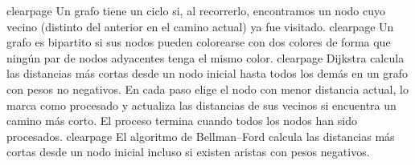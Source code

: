 {}\markdownRendererInterblockSeparator
{}\markdownRendererDollarSign{}\markdownRendererBackslash{}clearpage\markdownRendererDollarSign{}\markdownRendererInterblockSeparator
{}
\markdownRendererSectionEnd \markdownRendererSectionBegin
{}\markdownRendererInterblockSeparator
{}Un grafo tiene un ciclo si, al recorrerlo, encontramos un nodo cuyo vecino (distinto del anterior en el camino actual) ya fue visitado.\markdownRendererInterblockSeparator
{}\markdownRendererInterblockSeparator
{}\markdownRendererDollarSign{}\markdownRendererBackslash{}clearpage\markdownRendererDollarSign{}\markdownRendererInterblockSeparator
{}
\markdownRendererSectionEnd \markdownRendererSectionBegin
{}\markdownRendererInterblockSeparator
{}Un grafo es bipartito si sus nodos pueden colorearse con dos colores de forma que ningún par de nodos adyacentes tenga el mismo color.\markdownRendererInterblockSeparator
{}\markdownRendererInterblockSeparator
{}\markdownRendererDollarSign{}\markdownRendererBackslash{}clearpage\markdownRendererDollarSign{}\markdownRendererInterblockSeparator
{}
\markdownRendererSectionEnd 
\markdownRendererSectionEnd \markdownRendererSectionBegin
{}\markdownRendererParagraphSeparator
{}\markdownRendererSectionBegin
{}\markdownRendererInterblockSeparator
{}Dijkstra calcula las distancias más cortas desde un nodo inicial hasta todos los demás en un grafo con pesos no negativos.\markdownRendererParagraphSeparator
{}En cada paso elige el nodo con menor distancia actual, lo marca como procesado y actualiza las distancias de sus vecinos si encuentra un camino más corto. El proceso termina cuando todos los nodos han sido procesados.\markdownRendererParagraphSeparator
{}\markdownRendererParagraphSeparator
{}\markdownRendererDollarSign{}\markdownRendererBackslash{}clearpage\markdownRendererDollarSign{}\markdownRendererInterblockSeparator
{}
\markdownRendererSectionEnd \markdownRendererSectionBegin
{}\markdownRendererInterblockSeparator
{}El algoritmo de Bellman–Ford calcula las distancias más cortas desde un nodo inicial incluso si existen aristas con pesos negativos.\markdownRendererParagraphSeparator
